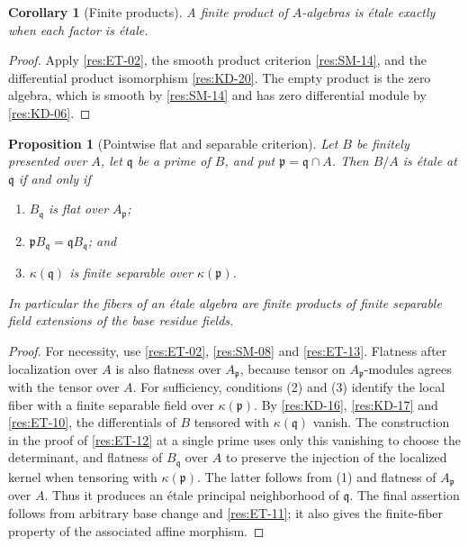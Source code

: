 \documentclass[11pt,oneside,openany]{book}
\newtheorem{proposition}[theorem]{Proposition}
\newtheorem{corollary}[theorem]{Corollary}
\theoremstyle{definition}
\theoremstyle{remark}
\begin{document}
\begin{corollary}[Finite products]\label{res:ET-17}
A finite product of $A$-algebras is \'{e}tale exactly when each
factor is \'{e}tale.
\end{corollary}
\begin{proof}
Apply \ref{res:ET-02}, the smooth product criterion
\ref{res:SM-14}, and the differential product isomorphism
\ref{res:KD-20}. The empty product is the zero algebra, which is
smooth by \ref{res:SM-14} and has zero differential module
by \ref{res:KD-06}.
\end{proof}

\begin{proposition}[Pointwise flat and separable criterion]\label{res:ET-18}
Let $B$ be finitely presented over $A$, let $\mathfrak q$ be a
prime of $B$, and put $\mathfrak p=\mathfrak q\cap A$. Then $B/A$ is \'{e}tale at
$\mathfrak q$ if and only if
\begin{enumerate}
\item $B_{\mathfrak q}$ is flat over $A_{\mathfrak p}$;
\item $\mathfrak p B_{\mathfrak q}=\mathfrak q B_{\mathfrak q}$; and
\item $\kappa(\mathfrak q)$ is finite separable over $\kappa(\mathfrak p)$.
\end{enumerate}
In particular the fibers of an \'{e}tale algebra are finite products
of finite separable field extensions of the base residue fields.
\end{proposition}
\begin{proof}
For necessity, use \ref{res:ET-02}, \ref{res:SM-08} and
\ref{res:ET-13}. Flatness after localization over $A$ is also
flatness over $A_{\mathfrak p}$, because tensor on
$A_{\mathfrak p}$-modules agrees with the tensor over $A$.
For sufficiency, conditions (2) and (3) identify the local
fiber with a finite separable field over $\kappa(\mathfrak p)$.
By \ref{res:KD-16}, \ref{res:KD-17} and \ref{res:ET-10}, the
differentials of $B$ tensored with $\kappa(\mathfrak q)$ vanish.
The construction in the proof of \ref{res:ET-12} at a single
prime uses only this vanishing to choose the determinant, and
flatness of $B_{\mathfrak q}$ over $A$ to preserve the injection
of the localized kernel when tensoring with $\kappa(\mathfrak p)$.
The latter follows from (1) and flatness of $A_{\mathfrak p}$
over $A$. Thus it produces an \'{e}tale principal neighborhood
of $\mathfrak q$. The final assertion follows from arbitrary
base change and \ref{res:ET-11}; it also gives the finite-fiber
property of the associated affine morphism.
\end{proof}
\end{document}
